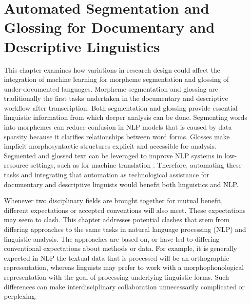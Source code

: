 \chapter{Automated Segmentation and Glossing for Documentary and Descriptive Linguistics}
\label{chap:seggloss}

This chapter examines how variations in research design could affect the integration of machine learning for morpheme segmentation and glossing of under-documented languages. Morpheme segmentation and glossing are traditionally the first tasks undertaken in the documentary and descriptive workflow after transcription. Both segmentation and glossing provide essential linguistic information from which deeper analysis can be done. Segmenting words into morphemes can reduce confusion in NLP models that is caused by data sparsity because it clarifies relationships between word forms. Glosses make implicit morphosyntactic structures explicit and accessible for analysis. Segmented and glossed text can be leveraged to improve NLP systems in low-resource settings, such as for machine translation \citep{shearing_improving_2018,zhou_using_2020}. Therefore, automating these tasks and integrating that automation as technological assistance for documentary and descriptive linguists would benefit both linguistics and NLP.

Whenever two disciplinary fields are brought together for mutual benefit, different expectations or accepted conventions will also meet. These expectations may seem to clash. This chapter addresses potential clashes that stem from differing approaches to the same tasks in natural language processing (NLP) and linguistic analysis. The approaches are based on, or have led to differing conventional expectations about methods or data. For example, it is generally expected in NLP the textual data that is processed will be an orthographic representation, whereas linguists may prefer to work with a  morphophonological representation with the goal of processing underlying linguistic forms. Such differences can make interdisciplinary collaboration unnecessarily complicated or perplexing. 

